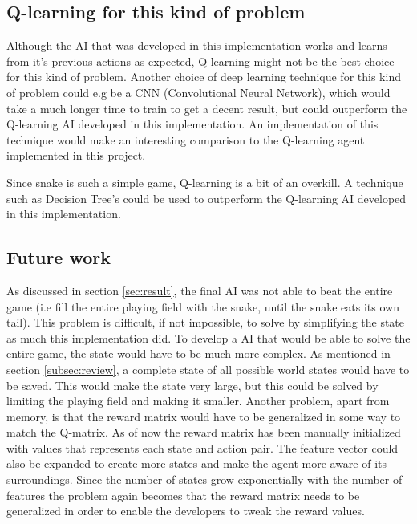 \documentclass[fleqn,10pt]{SelfArx} %
\begin{document}
\subsection{Q-learning for this kind of problem}
\label{subsec:other techniques}
Although the AI that was developed in this implementation works and learns from it's previous actions as expected, Q-learning might not be the best choice for this kind of problem. Another choice of deep learning technique for this kind of problem could e.g be a CNN (Convolutional Neural Network), which would take a much longer time to train to get a decent result, but could outperform the Q-learning AI developed in this implementation. An implementation of this technique would make an interesting comparison to the Q-learning agent implemented in this project.

Since snake is such a simple game, Q-learning is a bit of an overkill. A technique such as Decision Tree's could be used to outperform the Q-learning AI developed in this implementation.

\subsection{Future work}
\label{subsec:future work}
As discussed in section \ref{sec:result}, the final AI was not able to beat the entire game (i.e fill the entire playing field with the snake, until the snake eats its own tail). This problem is difficult, if not impossible, to solve by simplifying the state as much this implementation did. To develop a AI that would be able to solve the entire game, the state would have to be much more complex. As mentioned in section \ref{subsec:review}, a complete state of all possible world states would have to be saved. This would make the state very large, but this could be solved by limiting the playing field and making it smaller. Another problem, apart from memory, is that the reward matrix would have to be generalized in some way to match the Q-matrix. As of now the reward matrix has been manually initialized with values that represents each state and action pair. The feature vector could also be expanded to create more states and make the agent more aware of its surroundings. Since the number of states grow exponentially with the number of features the problem again becomes that the reward matrix needs to be generalized in order to enable the developers to tweak the reward values. 

\end{document}
